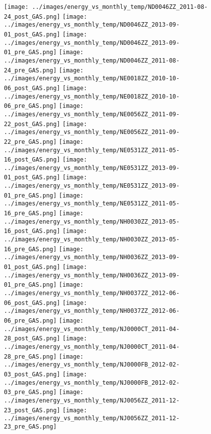 \clearpage
\begin{figure}
\centering
\texttt{[image: ../images/energy\_vs\_monthly\_temp/ND0046ZZ\_2011-08-24\_post\_GAS.png]}
\texttt{[image: ../images/energy\_vs\_monthly\_temp/ND0046ZZ\_2013-09-01\_post\_GAS.png]}
\texttt{[image: ../images/energy\_vs\_monthly\_temp/ND0046ZZ\_2013-09-01\_pre\_GAS.png]}
\texttt{[image: ../images/energy\_vs\_monthly\_temp/ND0046ZZ\_2011-08-24\_pre\_GAS.png]}
\texttt{[image: ../images/energy\_vs\_monthly\_temp/NE0018ZZ\_2010-10-06\_post\_GAS.png]}
\texttt{[image: ../images/energy\_vs\_monthly\_temp/NE0018ZZ\_2010-10-06\_pre\_GAS.png]}
\texttt{[image: ../images/energy\_vs\_monthly\_temp/NE0056ZZ\_2011-09-22\_post\_GAS.png]}
\texttt{[image: ../images/energy\_vs\_monthly\_temp/NE0056ZZ\_2011-09-22\_pre\_GAS.png]}
\texttt{[image: ../images/energy\_vs\_monthly\_temp/NE0531ZZ\_2011-05-16\_post\_GAS.png]}
\texttt{[image: ../images/energy\_vs\_monthly\_temp/NE0531ZZ\_2013-09-01\_post\_GAS.png]}
\texttt{[image: ../images/energy\_vs\_monthly\_temp/NE0531ZZ\_2013-09-01\_pre\_GAS.png]}
\texttt{[image: ../images/energy\_vs\_monthly\_temp/NE0531ZZ\_2011-05-16\_pre\_GAS.png]}
\texttt{[image: ../images/energy\_vs\_monthly\_temp/NH0030ZZ\_2013-05-16\_post\_GAS.png]}
\texttt{[image: ../images/energy\_vs\_monthly\_temp/NH0030ZZ\_2013-05-16\_pre\_GAS.png]}
\texttt{[image: ../images/energy\_vs\_monthly\_temp/NH0036ZZ\_2013-09-01\_post\_GAS.png]}
\texttt{[image: ../images/energy\_vs\_monthly\_temp/NH0036ZZ\_2013-09-01\_pre\_GAS.png]}
\texttt{[image: ../images/energy\_vs\_monthly\_temp/NH0037ZZ\_2012-06-06\_post\_GAS.png]}
\texttt{[image: ../images/energy\_vs\_monthly\_temp/NH0037ZZ\_2012-06-06\_pre\_GAS.png]}
\texttt{[image: ../images/energy\_vs\_monthly\_temp/NJ0000CT\_2011-04-28\_post\_GAS.png]}
\texttt{[image: ../images/energy\_vs\_monthly\_temp/NJ0000CT\_2011-04-28\_pre\_GAS.png]}
\texttt{[image: ../images/energy\_vs\_monthly\_temp/NJ0000FB\_2012-02-03\_post\_GAS.png]}
\texttt{[image: ../images/energy\_vs\_monthly\_temp/NJ0000FB\_2012-02-03\_pre\_GAS.png]}
\texttt{[image: ../images/energy\_vs\_monthly\_temp/NJ0056ZZ\_2011-12-23\_post\_GAS.png]}
\texttt{[image: ../images/energy\_vs\_monthly\_temp/NJ0056ZZ\_2011-12-23\_pre\_GAS.png]}
\end{figure}
